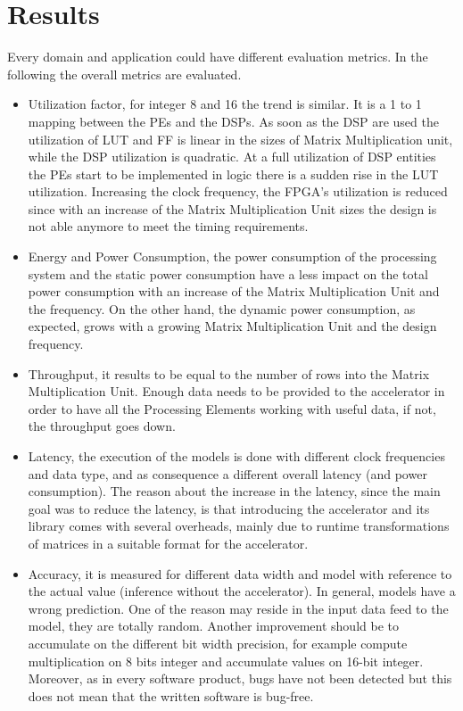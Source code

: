 \chapter{Results}
Every domain and application could have different evaluation metrics. In the following the overall metrics are evaluated.
\begin{itemize}
\item Utilization factor, for integer 8 and 16 the trend is similar. It is a 1 to 1 mapping between the PEs and the DSPs. As soon as the DSP are used the utilization of LUT and FF is linear in the sizes of Matrix Multiplication unit, while the DSP utilization is quadratic. At a full utilization of DSP entities the PEs start to be implemented in logic there is a sudden rise in the LUT utilization. Increasing the clock frequency, the FPGA's utilization is reduced since with an increase of the Matrix Multiplication Unit sizes the design is not able anymore to meet the timing requirements.
\item Energy and Power Consumption, the power consumption of the processing system and the static power consumption have a less impact on the total power consumption with an increase of the Matrix Multiplication Unit and the frequency. On the other hand, the dynamic power consumption, as expected, grows with a growing Matrix Multiplication Unit and the design frequency.
\item Throughput, it results to be equal to the number of rows into the Matrix Multiplication Unit. Enough data needs to be provided to the accelerator in order to have all the Processing Elements working with useful data, if not, the throughput goes down.
\item Latency, the execution of the models is done with different clock frequencies and data type, and as consequence a different overall latency (and power consumption). The reason about the increase in the latency, since the main goal was to reduce the latency, is that introducing the accelerator and its library comes with several overheads, mainly due to runtime transformations of matrices in a suitable format for the accelerator.
\item Accuracy, it is measured for different data width and model with reference to the actual value (inference without the accelerator). In general, models have a wrong prediction. One of the reason may reside in the input data feed to the model, they are totally random. Another improvement should be to accumulate on the different bit width precision, for example compute multiplication on 8 bits integer and accumulate values on 16-bit integer. Moreover, as in every software product, bugs have not been detected but this does not mean that the written software is bug-free.
\end{itemize}